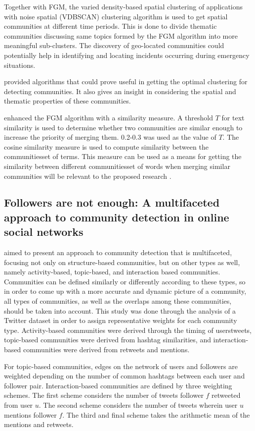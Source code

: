 Together with FGM, the varied density-based spatial clustering of applications with noise spatial (VDBSCAN) clustering algorithm is used to get spatial communities at different time periods. This is done to divide thematic communities discussing same topics formed by the FGM algorithm into more meaningful sub-clusters. The discovery of geo-located communities could potentially help in identifying and locating incidents occurring during emergency situations.


 provided algorithms that could prove useful in getting the optimal clustering for detecting communities. It also gives an insight in considering the spatial and thematic properties of these communities.


 enhanced the FGM algorithm with a similarity measure. A threshold $T$ for text similarity is used to determine whether two communities are similar enough to increase the priority of merging them. 0.2-0.3 was used as the value of $T$. The cosine similarity measure is used to compute similarity between the communities\vtick set of terms. This measure can be used as a means for getting the similarity between different communities\vtick set of words when merging similar communities will be relevant to the proposed research \cite{Bakillah:2014}.


\subsection{Followers are not enough: A multifaceted approach to community detection in online social networks}


 aimed to present an approach to community detection that is multifaceted, focusing not only on structure-based communities, but on other types as well, namely activity-based, topic-based, and interaction based communities. Communities can be defined similarly or differently according to these types, so in order to come up with a more accurate and dynamic picture of a community, all types of communities, as well as the overlaps among these communities, should be taken into account. This study was done through the analysis of a Twitter dataset in order to assign representative weights for each community type. Activity-based communities were derived through the timing of users\vtick tweets, topic-based communities were derived from hashtag similarities, and interaction-based communities were derived from retweets and mentions. 


For topic-based communities, edges on the network of users and followers are weighted depending on the number of common hashtags between each user and follower pair. Interaction-based communities are defined by three weighting schemes. The first scheme considers the number of tweets follower $f$ retweeted from user $u$. The second scheme considers the number of tweets wherein user $u$ mentions follower $f$. The third and final scheme takes the arithmetic mean of the mentions and retweets.


